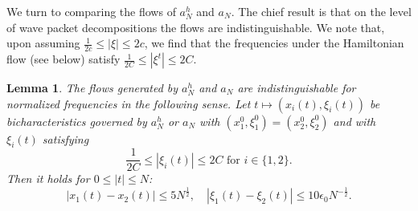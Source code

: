 \documentclass{amsart}
\numberwithin{equation}{section}
\newtheorem{lemma}[theorem]{Lemma}
\theoremstyle{definition}
\begin{document}
We turn to comparing the flows of $a_N^h$ and $a_{N}$. The chief result is that on the level of wave packet decompositions the flows are indistinguishable. We note that, upon assuming $\frac{1}{2c} \leq |\xi| \leq 2c$, we find that the frequencies under the Hamiltonian flow (see below) satisfy $\frac{1}{2C} \leq |\xi^t| \leq 2C$.

\begin{lemma}
\label{lem:Comparison}
The flows generated by $a_N^h$ and $a_N$ are indistinguishable for normalized frequencies in the following sense.
Let $t\mapsto (x_{i}(t),\xi_i(t))$ be bicharacteristics governed by $a_N^h$ or $a_N$ with $(x_1^0,\xi_1^0) = (x_2^0,\xi_2^0)$ and
with $\xi_i(t)$ satisfying
\begin{equation*}
\frac{1}{2C} \leq |\xi_i(t)| \leq 2C \text{ for } i \in \{ 1, 2 \}.
\end{equation*}
Then it holds for $0 \leq |t| \leq N$:
\begin{equation}
\label{eq:SmallFlowDifference}
|x_1(t) - x_2(t) | \leq 5  N^{\frac{1}{2}}, \quad |\xi_1(t) - \xi_2(t)| \leq 10 \epsilon_0 N^{-\frac{1}{2}}.
\end{equation}
\end{lemma}
\end{document}
